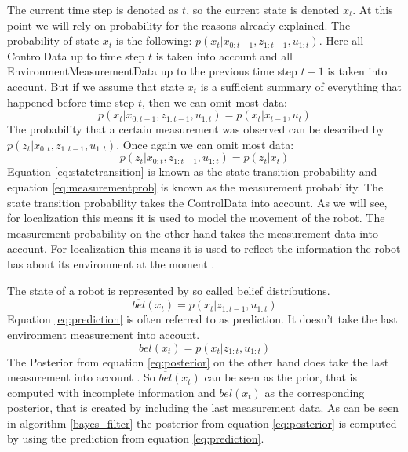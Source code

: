 The current time step is denoted as $t$, so the current state is denoted $x_t$. At this point we will rely on probability for the reasons already explained. The probability of state $x_t$ is the following: $p(x_t|x_{0:t-1},z_{1:t-1}, u_{1:t})$. Here all \gls{ControlData} up to time step $t$ is taken into account and all \gls{EnvironmentMeasurementData} up to the previous time step $t-1$ is taken into account. But if we assume that state $x_t$ is a sufficient summary of everything that happened before time step $t$, then we can omit most data: 
\begin{equation} \label{eq:statetransition}
p(x_t|x_{0:t-1},z_{1:t-1}, u_{1:t}) = p(x_t|x_{t-1}, u_t)
\end{equation}
The probability that a certain measurement was observed can be described by $p(z_t|x_{0:t},z_{1:t-1}, u_{1:t})$. Once again we can omit most data:
\begin{equation} \label{eq:measurementprob}
p(z_t|x_{0:t},z_{1:t-1}, u_{1:t}) = p(z_t|x_t)
\end{equation}
Equation \ref{eq:statetransition} is known as the state transition probability and equation \ref{eq:measurementprob} is known as the measurement probability. The state transition probability takes the \gls{ControlData} into account. As we will see, for localization this means it is used to model the movement of the robot. The measurement probability on the other hand takes the measurement data into account. For localization this means it is used to reflect the information the robot has about its environment at the moment \citep[p.\ 24-25]{Thrun:2005:PR:1121596}.

The state of a robot is represented by so called belief distributions. 
\begin{equation} \label{eq:prediction}
\overline{bel}(x_t) = p(x_t|z_{1:t-1}, u_{1:t})
\end{equation}
Equation \ref{eq:prediction} is often referred to as prediction. It doesn't take the last environment measurement into account. 
\begin{equation} \label{eq:posterior}
bel(x_t) = p(x_t|z_{1:t}, u_{1:t})
\end{equation}
The \gls{Posterior} from equation \ref{eq:posterior} on the other hand does take the last measurement into account \citep[p.\ 25-26]{Thrun:2005:PR:1121596}. So $\overline{bel}(x_t)$ can be seen as the prior, that is computed with incomplete information and ${bel}(x_t)$ as the corresponding posterior, that is created by including the last measurement data. As can be seen in algorithm \ref{bayes_filter} the posterior from equation \ref{eq:posterior} is computed by using the prediction from equation \ref{eq:prediction}.

